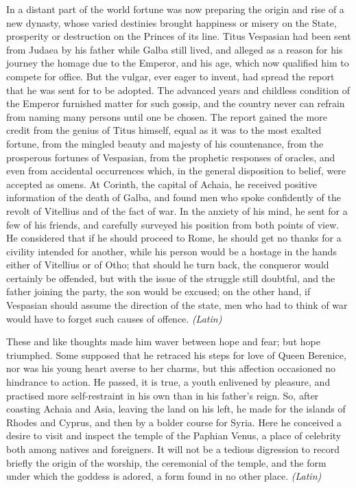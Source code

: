 In a distant part of the world fortune was now preparing the origin and rise of a new dynasty, whose varied destinies brought happiness or misery on the State, prosperity or destruction on the Princes of its line. Titus Vespasian had been sent from Judaea by his father while Galba still lived, and alleged as a reason for his journey the homage due to the Emperor, and his age, which now qualified him to compete for office. But the vulgar, ever eager to invent, had spread the report that he was sent for to be adopted. The advanced years and childless condition of the Emperor furnished matter for such gossip, and the country never can refrain from naming many persons until one be chosen. The report gained the more credit from the genius of Titus himself, equal as it was to the most exalted fortune, from the mingled beauty and majesty of his countenance, from the prosperous fortunes of Vespasian, from the prophetic responses of oracles, and even from accidental occurrences which, in the general disposition to belief, were accepted as omens. At Corinth, the capital of Achaia, he received positive information of the death of Galba, and found men who spoke confidently of the revolt of Vitellius and of the fact of war. In the anxiety of his mind, he sent for a few of his friends, and carefully surveyed his position from both points of view. He considered that if he should proceed to Rome, he should get no thanks for a civility intended for another, while his person would be a hostage in the hands either of Vitellius or of Otho; that should he turn back, the conqueror would certainly be offended, but with the issue of the struggle still doubtful, and the father joining the party, the son would be excused; on the other hand, if Vespasian should assume the direction of the state, men who had to think of war would have to forget such causes of offence. \emph{(Latin)}


These and like thoughts made him waver between hope and fear; but hope triumphed. Some supposed that he retraced his steps for love of Queen Berenice, nor was his young heart averse to her charms, but this affection occasioned no hindrance to action. He passed, it is true, a youth enlivened by pleasure, and practised more self-restraint in his own than in his father's reign. So, after coasting Achaia and Asia, leaving the land on his left, he made for the islands of Rhodes and Cyprus, and then by a bolder course for Syria. Here he conceived a desire to visit and inspect the temple of the Paphian Venus, a place of celebrity both among natives and foreigners. It will not be a tedious digression to record briefly the origin of the worship, the ceremonial of the temple, and the form under which the goddess is adored, a form found in no other place. \emph{(Latin)}

